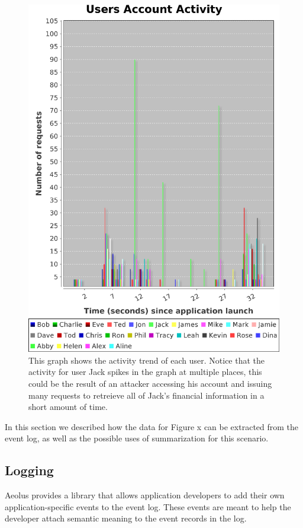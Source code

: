 \begin{figure}
\centering
\includegraphics[scale=0.85]{figures/activity.eps}
\caption{This graph shows the activity trend of each user. Notice that the activity for user Jack spikes in the graph at multiple places, this could be the result of an attacker accessing his account and issuing many requests to retreieve all of Jack's financial information in a short amount of time.}
\label{figure:activity}
\end{figure}
In this section we described how the data for Figure x can be extracted from the event log, as well as the possible uses of summarization for this scenario.

\subsection{Logging}

Aeolus provides a library that allows application developers to add their own application-specific events to the event log. These events are meant to help the developer attach semantic meaning to the event records in the log.

